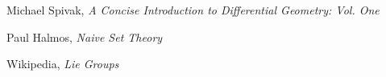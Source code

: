 \begin{thebibliography}{10}
     Michael Spivak,
    \emph{A Concise Introduction to Differential Geometry: Vol. One}

     Paul Halmos,
    \emph{Naive Set Theory}

     Wikipedia,
    \emph{Lie Groups}
\end{thebibliography}





%
%
%
%


